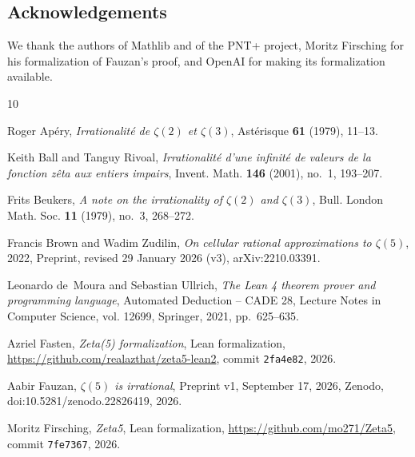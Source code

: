 \documentclass[11pt]{amsart}
\theoremstyle{definition}
\theoremstyle{remark}
\numberwithin{equation}{section}
\begin{document}
\subsection*{Acknowledgements}
We thank the authors of Mathlib and of the PNT+ project, Moritz Firsching for his formalization of Fauzan's proof, and
OpenAI for making its formalization available.

\providecommand{\bysame}{\leavevmode\hbox to3em{\hrulefill}\thinspace}
\providecommand{\MR}{\relax\ifhmode\unskip\space\fi MR }
\providecommand{\MRhref}[2]{%
  \href{http://www.ams.org/mathscinet-getitem?mr=#1}{#2}
}
\providecommand{\href}[2]{#2}
\begin{thebibliography}{10}

Roger Ap\'ery, \emph{Irrationalit\'e de {$\zeta(2)$} et {$\zeta(3)$}},
  Ast\'erisque \textbf{61} (1979), 11--13.

Keith Ball and Tanguy Rivoal, \emph{Irrationalit\'e d'une infinit\'e de valeurs
  de la fonction z\^eta aux entiers impairs}, Invent. Math. \textbf{146}
  (2001), no.~1, 193--207.

Frits Beukers, \emph{A note on the irrationality of {$\zeta(2)$} and
  {$\zeta(3)$}}, Bull. London Math. Soc. \textbf{11} (1979), no.~3, 268--272.

Francis Brown and Wadim Zudilin, \emph{On cellular rational approximations to
  {$\zeta(5)$}}, 2022, Preprint, revised 29 January 2026 (v3),
  \href{https://arxiv.org/abs/2210.03391}{arXiv:2210.03391}.

Leonardo de~Moura and Sebastian Ullrich, \emph{The {L}ean 4 theorem prover and
  programming language}, Automated Deduction -- CADE 28, Lecture Notes in
  Computer Science, vol. 12699, Springer, 2021, pp.~625--635.

Azriel Fasten, \emph{Zeta(5) formalization}, Lean formalization,
  \url{https://github.com/realazthat/zeta5-lean2}, commit \texttt{2fa4e82},
  2026.

Aabir Fauzan, \emph{{$\zeta(5)$} is irrational}, Preprint v1, September 17,
  2026, Zenodo,
  \href{https://doi.org/10.5281/zenodo.22826419}{doi:10.5281/zenodo.22826419},
  2026.

Moritz Firsching, \emph{Zeta5}, Lean formalization,
  \url{https://github.com/mo271/Zeta5}, commit \texttt{7fe7367}, 2026.


\end{thebibliography}
\end{document}
